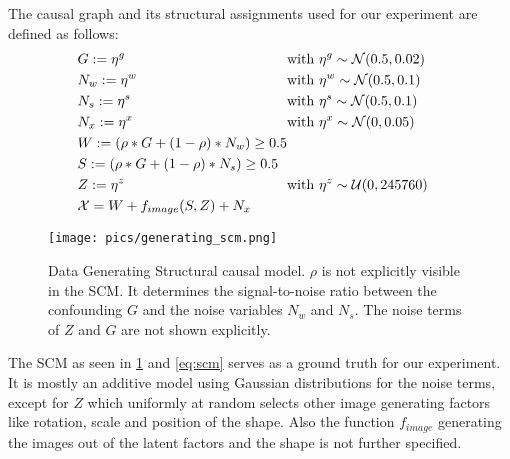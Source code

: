 The causal graph and its structural assignments used for our experiment are defined as follows: 
\begin{equation}
\label{eq:scm}
\begin{aligned}[c]
&G:=\eta^g \notag \\ 
&N_w:=\eta^w  \notag \\ 
&N_s:=\eta^s \notag \\ 
&N_x:=\eta^x  \notag \\ 
&W:=(\rho * G + (1-\rho)* N_w) \geq 0.5 \notag \\ 
&S:=(\rho * G + (1-\rho)* N_s) \geq 0.5 \notag \\ 
&Z:= \eta^z \\ 
& \mathcal{X} = W + f_{image}(S, Z) + N_{x} \\
\end{aligned}
\begin{aligned}[c]
& \mathrm{with} \  \eta^g \sim \mathcal{N}(0.5,0.02) && \notag \\ 
& \mathrm{with} \  \eta^w \sim \mathcal{N}(0.5,0.1) && \notag \\ 
& \mathrm{with} \  \eta^s \sim \mathcal{N}(0.5,0.1) && \notag \\ 
& \mathrm{with} \  \eta^x \sim \mathcal{N}(0,0.05) && \notag \\ 
\\
\\
& \mathrm{with} \  \eta^z \sim \mathcal{U}(0,245760) && \notag \\ 
\\
\end{aligned}
\end{equation}

\begin{figure}[t!]
    \centering
    \texttt{[image: pics/generating\_scm.png]}
    \caption[Data Generating SCM]{Data Generating Structural causal model.
        $\rho$ is not explicitly visible in the SCM. It determines the signal-to-noise ratio between the confounding $G$ and the noise variables $N_w$ and $N_s$. The noise terms of $Z$ and $G$ are not shown explicitly.}
    \label{fig:generating_scm}
\end{figure}

The SCM as seen in \cref{fig:generating_scm} and \cref{eq:scm} serves as a ground truth for our experiment. It is mostly an additive model using Gaussian distributions for the noise terms, except for $Z$ which uniformly at random selects other image generating factors like rotation, scale and position of the shape. Also the function $f_{image}$ generating the images out of the latent factors and the shape is not further specified.

